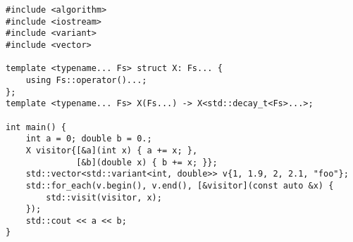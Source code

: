 \begin{lstlisting}[title=\href{https://godbolt.org/z/Vntvr9}{\texttt{godbolt.org/z/Vntvr9}}]
#include <algorithm>
#include <iostream>
#include <variant>
#include <vector>

template <typename... Fs> struct X: Fs... {
    using Fs::operator()...;
};
template <typename... Fs> X(Fs...) -> X<std::decay_t<Fs>...>;

int main() {
    int a = 0; double b = 0.;
    X visitor{[&a](int x) { a += x; },
              [&b](double x) { b += x; }};
    std::vector<std::variant<int, double>> v{1, 1.9, 2, 2.1, "foo"};
    std::for_each(v.begin(), v.end(), [&visitor](const auto &x) {
        std::visit(visitor, x);
    });
    std::cout << a << b;
}
\end{lstlisting}
